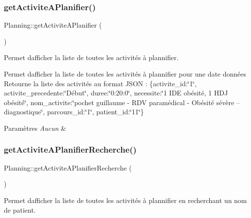 \subsubsection{\texorpdfstring{get\+Activite\+A\+Planifier()}{getActiviteAPlanifier()}}
{\footnotesize\ttfamily Planning\+::get\+Activite\+A\+Planifier (\begin{DoxyParamCaption}{ }\end{DoxyParamCaption})}



Permet d\textquotesingle{}afficher la liste de toutes les activités à plannifier. 

Permet d\textquotesingle{}afficher la liste de toutes les activités à plannifier pour une date données Retourne la liste des activités au format J\+S\+ON \+: \{activite\+\_\+id\+:\char`\"{}1\char`\"{}, activite\+\_\+precedente\+:\char`\"{}\+Début\char`\"{}, duree\+:\char`\"{}0\+:20\+:0\char`\"{}, necessite\+:\char`\"{}1 I\+D\+E obésité, 1 H\+D\+J obésité\char`\"{}, nom\+\_\+activite\+:\char`\"{}pochet guillaume -\/ R\+D\+V paramédical -\/ Obésité sévère – diagnostique\char`\"{}, parcours\+\_\+id\+:\char`\"{}1\char`\"{}, patient\+\_\+id\+:\char`\"{}11\char`\"{}\} 
\begin{DoxyParams}{Paramètres}
{\em Aucun} & \\
\hline
\end{DoxyParams}
\mbox{\label{class_planning_a37907a80875259e9962aacda1e9431cd}} 
\subsubsection{\texorpdfstring{get\+Activite\+A\+Planifier\+Recherche()}{getActiviteAPlanifierRecherche()}}
{\footnotesize\ttfamily Planning\+::get\+Activite\+A\+Planifier\+Recherche (\begin{DoxyParamCaption}{ }\end{DoxyParamCaption})}



Permet d\textquotesingle{}afficher la liste de toutes les activités à plannifier en recherchant un nom de patient. 

